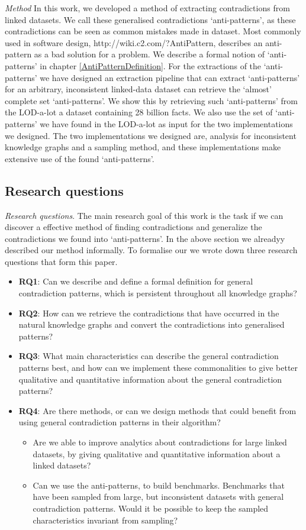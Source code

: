 \documentclass{article}
\begin{document}
\textit{Method} In this work, we developed a method of extracting contradictions from linked datasets. We call these generalised contradictions `anti-patterns', as these contradictions can be seen as common mistakes made in dataset. Most commonly used in software design, http://wiki.c2.com/?AntiPattern, describes an anti-pattern as a bad solution for a problem. We describe a formal notion of `anti-patterns' in chapter \ref{AntiPatternDefinition}.
For the extractions of the `anti-patterns' we have designed an extraction pipeline that can extract `anti-patterns' for an arbitrary, inconsistent linked-data dataset can retrieve the `almost' complete set `anti-patterns'. We show this by retrieving such `anti-patterns' from the LOD-a-lot\cite{JavierD:2017} a dataset containing 28 billion facts. We also use the set of `anti-patterns' we have found in the LOD-a-lot as input for the two implementations we designed. The two implementations we designed are, analysis for inconsistent knowledge graphs and a sampling method, and these implementations make extensive use of the found `anti-patterns'. 

\subsection{Research questions}
\textit{Research questions}. The main research goal of this work is the task if we can discover a effective method of finding contradictions and generalize the contradictions we found into `anti-patterns'. In the above section we alreadyy described our method informally. To formalise our we wrote down three research questions that form this paper.

\begin{itemize}
	\item \textbf{RQ1}: Can we describe and define a formal definition for general contradiction patterns, which is persistent throughout all knowledge graphs?
	\item \textbf{RQ2}: How can we retrieve the contradictions that have occurred in the natural knowledge graphs and convert the contradictions into generalised patterns?
	\item \textbf{RQ3}: What main characteristics can describe the general contradiction patterns best, and how can we implement these commonalities to give better qualitative and quantitative information about the general contradiction patterns?
	\item \textbf{RQ4}: Are there methods, or can we design methods that could benefit from using general contradiction patterns in their algorithm? 
	\begin{itemize}
		\item Are we able to improve analytics about contradictions for large linked datasets, by giving qualitative and quantitative information about a linked datasets?
		\item Can we use the anti-patterns, to build benchmarks. Benchmarks that have been sampled from large, but inconsistent datasets with general contradiction patterns. Would it be possible to keep the sampled characteristics invariant from sampling?
	\end{itemize}
\end{itemize}
\end{document}
